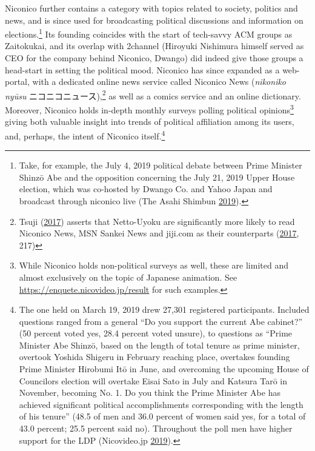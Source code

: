 \documentclass[10pt,british,A4paper,twoside]{memoir}
\begin{document}
Niconico further contains a category with topics related to society,
politics and news, and is since used for broadcasting political
discussions and information on elections.\footnote{Take, for example,
  the July 4, 2019 political debate between Prime Minister Shinzō Abe
  and the opposition concerning the July 21, 2019 Upper House election,
  which was co-hosted by Dwango Co. and Yahoo Japan and broadcast
  through niconico live (The Asahi Shimbun
  \protect\hyperlink{ref-the_asahi_shimbun_constitutional_2019}{2019}).}
Its founding coincides with the start of tech-savvy ACM groups as
Zaitokukai, and its overlap with 2channel (Hiroyuki Nishimura himself
served as CEO for the company behind Niconico, Dwango) did indeed give
those groups a head-start in setting the political mood. Niconico has
since expanded as a web-portal, with a dedicated online news service
called Niconico News (\emph{nikoniko nyūsu} ニコニコニュース),\footnote{Tsuji
  (\protect\hyperlink{ref-tsuji_eng._2017}{2017}) asserts that
  Netto-Uyoku are significantly more likely to read Niconico News, MSN
  Sankei News and jiji.com as their counterparts
  (\protect\hyperlink{ref-tsuji_eng._2017}{2017}, 217)} as well as a
comics service and an online dictionary. Moreover, Niconico holds
in-depth monthly surveys polling political opinions\footnote{While
  Niconico holds non-political surveys as well, these are limited and
  almost exclusively on the topic of Japanese animation. See
  \url{https://enquete.nicovideo.jp/result} for such examples.} giving
both valuable insight into trends of political affiliation among its
users, and, perhaps, the intent of Niconico itself.\footnote{The one
  held on March 19, 2019 drew 27,301 registered participants. Included
  questions ranged from a general ``Do you support the current Abe
  cabinet?'' (50 percent voted yes, 28.4 percent voted unsure), to
  questions as ``Prime Minister Abe Shinzō, based on the length of total
  tenure as prime minister, overtook Yoshida Shigeru in February
  reaching  place, overtakes founding Prime Minister Hirobumi Itō
  in June, and overcoming the upcoming House of Councilors election will
  overtake Eisai Sato in July and Katsura Tarō in November, becoming No.
  1. Do you think the Prime Minister Abe has achieved significant
  political accomplishments corresponding with the length of his
  tenure'' (48.5 of men and 36.0 percent of women said yes, for a total
  of 43.0 percent; 25.5 percent said no). Throughout the poll men have
  higher support for the LDP (Nicovideo.jp
  \protect\hyperlink{ref-nicovideo.jp_monthly_2019}{2019}).}
\end{document}
